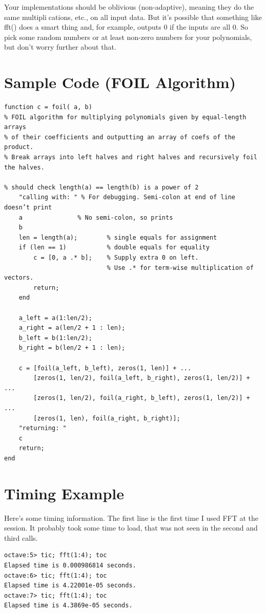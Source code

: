 \documentclass[lang=cn,11pt]{elegantbook}
\begin{document}
Your implementations should be oblivious (non-adaptive), meaning they do the same multipli￾cations, etc., on all input data. But it’s possible that something like fft() does a smart thing and, for example, outputs 0 if the inputs are all 0. So pick some random numbers or at least non-zero numbers for your polynomials, but don’t worry further about that.





\section*{Sample Code (FOIL Algorithm)}

\begin{verbatim}
function c = foil( a, b)
% FOIL algorithm for multiplying polynomials given by equal-length arrays
% of their coefficients and outputting an array of coefs of the product.
% Break arrays into left halves and right halves and recursively foil the halves.

% should check length(a) == length(b) is a power of 2
    "calling with: " % For debugging. Semi-colon at end of line doesn’t print
    a               % No semi-colon, so prints
    b 
    len = length(a);        % single equals for assignment
    if (len == 1)           % double equals for equality
        c = [0, a .* b];    % Supply extra 0 on left.
                            % Use .* for term-wise multiplication of vectors.
        return;
    end
    
    a_left = a(1:len/2);
    a_right = a(len/2 + 1 : len);
    b_left = b(1:len/2);
    b_right = b(len/2 + 1 : len);
    
    c = [foil(a_left, b_left), zeros(1, len)] + ...
        [zeros(1, len/2), foil(a_left, b_right), zeros(1, len/2)] + ...
        [zeros(1, len/2), foil(a_right, b_left), zeros(1, len/2)] + ...
        [zeros(1, len), foil(a_right, b_right)];
    "returning: "
    c
    return;
end
\end{verbatim}

\section*{Timing Example}
Here’s some timing information. The first line is the first time I used FFT at the session. It probably took some time to load, that was not seen in the second and third calls.
\begin{verbatim}
octave:5> tic; fft(1:4); toc
Elapsed time is 0.000986814 seconds.
octave:6> tic; fft(1:4); toc
Elapsed time is 4.22001e-05 seconds.
octave:7> tic; fft(1:4); toc
Elapsed time is 4.3869e-05 seconds.
\end{verbatim}
\end{document}

